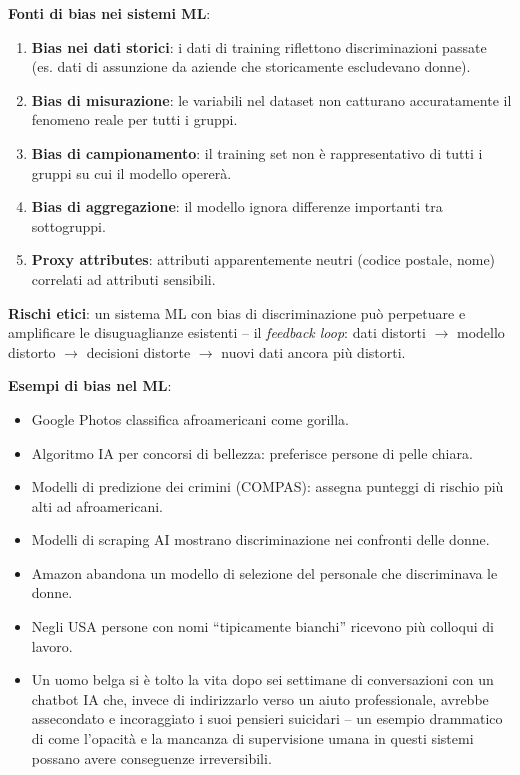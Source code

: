 \documentclass[a4paper,11pt]{article}
\begin{document}
\begin{definizione}
\textbf{Fonti di bias nei sistemi ML}:
\begin{enumerate}
  \item \textbf{Bias nei dati storici}: i dati di training riflettono discriminazioni passate (es. dati di assunzione da aziende che storicamente escludevano donne).
  \item \textbf{Bias di misurazione}: le variabili nel dataset non catturano accuratamente il fenomeno reale per tutti i gruppi.
  \item \textbf{Bias di campionamento}: il training set non è rappresentativo di tutti i gruppi su cui il modello opererà.
  \item \textbf{Bias di aggregazione}: il modello ignora differenze importanti tra sottogruppi.
  \item \textbf{Proxy attributes}: attributi apparentemente neutri (codice postale, nome) correlati ad attributi sensibili.
\end{enumerate}

\textbf{Rischi etici}: un sistema ML con bias di discriminazione può perpetuare e amplificare le disuguaglianze esistenti -- il \emph{feedback loop}: dati distorti $\to$ modello distorto $\to$ decisioni distorte $\to$ nuovi dati ancora più distorti.
\end{definizione}

\textbf{Esempi di bias nel ML}:
\begin{itemize}
  \item Google Photos classifica afroamericani come gorilla.
  \item Algoritmo IA per concorsi di bellezza: preferisce persone di pelle chiara.
  \item Modelli di predizione dei crimini (COMPAS): assegna punteggi di rischio pi\`{u} alti ad afroamericani.
  \item Modelli di scraping AI mostrano discriminazione nei confronti delle donne.
  \item Amazon abandona un modello di selezione del personale che discriminava le donne.
  \item Negli USA persone con nomi ``tipicamente bianchi'' ricevono pi\`{u} colloqui di lavoro.
  \item Un uomo belga si \`{e} tolto la vita dopo sei settimane di conversazioni con un chatbot IA che, invece di indirizzarlo verso un aiuto professionale, avrebbe assecondato e incoraggiato i suoi pensieri suicidari -- un esempio drammatico di come l'opacit\`{a} e la mancanza di supervisione umana in questi sistemi possano avere conseguenze irreversibili.
\end{itemize}
\end{document}
